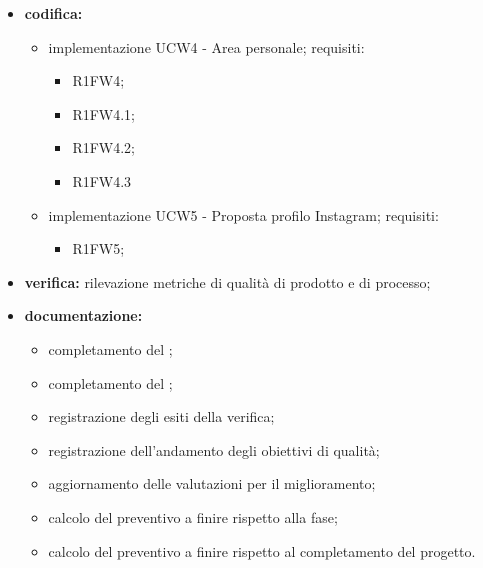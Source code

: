 \begin{itemize}
	\item \textbf{codifica:} 
			\begin{itemize}
				\item implementazione UCW4 - Area personale; requisiti:
					\begin{itemize}
						\item R1FW4;
      					\item R1FW4.1;
           				\item R1FW4.2;
               			\item R1FW4.3
					\end{itemize}
				\item implementazione UCW5 - Proposta profilo Instagram; requisiti:
					\begin{itemize}
						\item R1FW5;
					\end{itemize}
			\end{itemize}
 	\item \textbf{verifica:} rilevazione metriche di qualità di prodotto e di processo;
	\item \textbf{documentazione:} 
	 \begin{itemize}
		\item completamento del \MU{};
		\item completamento del \MA{};
  		\item registrazione degli esiti della verifica;
     	\item registrazione dell’andamento degli obiettivi di qualità;
		\item aggiornamento delle valutazioni per il miglioramento; 
		\item calcolo del preventivo a finire rispetto alla fase;
		\item calcolo del preventivo a finire rispetto al completamento del progetto.
	 \end{itemize}
\end{itemize}

\pagebreak

